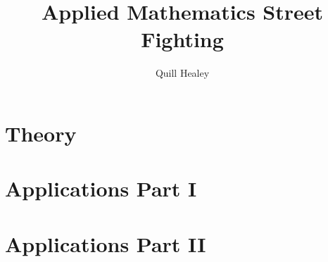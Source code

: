 \documentclass[12pt,reqno]{report}
\title{Applied Mathematics Street Fighting}
\author{Quill Healey}
\theoremstyle{definition}
\numberwithin{equation}{section}
\begin{document}
\maketitle
\tableofcontents

% 



\part{Theory}







\part{Applications Part I}













\part{Applications Part II}
\end{document}
